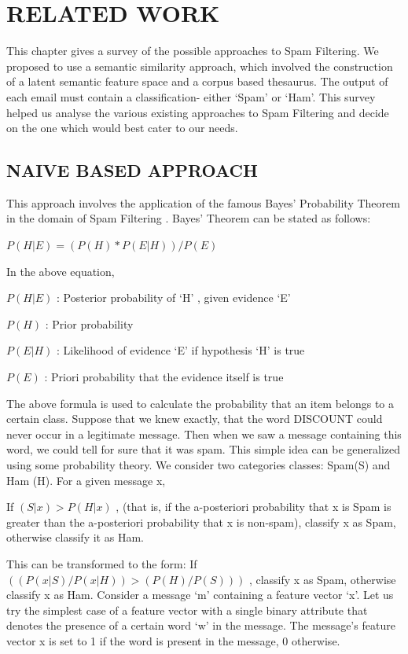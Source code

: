 \chapter{RELATED WORK} %
This chapter gives a survey of the possible approaches to Spam Filtering. We proposed to use a semantic similarity approach, which involved the construction of a latent semantic feature space and a corpus based thesaurus. The output of each email must contain a classification- either ‘Spam’ or ‘Ham’. This survey helped us analyse the various existing approaches to Spam Filtering and decide on the one which would best cater to our needs. 

\section{NAIVE BASED APPROACH}

This approach involves the application of the famous Bayes’ Probability Theorem in the domain of Spam Filtering \cite{1}.  Bayes’ Theorem can be stated as follows:

$P(H|E)=(P(H)*P(E|H))/P(E)$

In the above equation,


\textbf{$ P(H|E)$} : Posterior probability of ‘H’ , given evidence ‘E’


\textbf{$ P(H)$} : Prior probability


\textbf{$ P(E|H)$} : Likelihood of evidence ‘E’ if hypothesis ‘H’ is true


\textbf{$ P(E)$} : Priori probability that the evidence itself is true

The above formula is used to calculate the probability that an item belongs to a certain class. Suppose that we knew exactly, that the word DISCOUNT could never occur in a legitimate message. Then when we saw a message containing this word, we could tell for sure that it was spam. This simple idea can be generalized using some probability theory. We consider two categories classes: Spam(S) and Ham (H). For a given message x,

If $(S|x)>P(H|x)$ , (that is, if the a-posteriori probability that x is Spam is greater than the a-posteriori probability that x is non-spam), classify x as Spam, otherwise classify it as Ham.

This can be transformed to the form: If  $((P(x|S)/P(x|H))>(P(H)/P(S)))$ , classify x as Spam, otherwise classify x as Ham.
Consider a message ‘m’ containing a feature vector ‘x’. Let us try the simplest case of a feature vector with a single binary attribute that denotes the presence of a certain word ‘w’ in the message. The message’s feature vector x is set to 1 if the word is present in the message, 0 otherwise.

